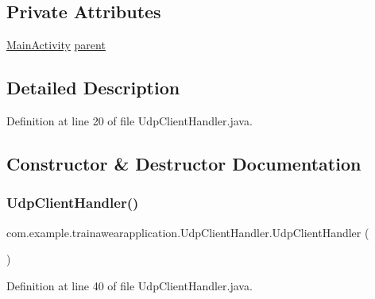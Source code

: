 \subsection*{Private Attributes}
\begin{DoxyCompactItemize}
\item 
\mbox{\hyperlink{classcom_1_1example_1_1trainawearapplication_1_1_main_activity}{Main\+Activity}} \mbox{\hyperlink{classcom_1_1example_1_1trainawearapplication_1_1_udp_client_handler_a93942bc64a7d7d570d27c9e485d361e4}{parent}}
\end{DoxyCompactItemize}


\subsection{Detailed Description}


Definition at line 20 of file Udp\+Client\+Handler.\+java.



\subsection{Constructor \& Destructor Documentation}
\mbox{\label{classcom_1_1example_1_1trainawearapplication_1_1_udp_client_handler_ab5ff425dbf594d074ab709f2be441419}} 
\subsubsection{\texorpdfstring{UdpClientHandler()}{UdpClientHandler()}}
{\footnotesize\ttfamily com.\+example.\+trainawearapplication.\+Udp\+Client\+Handler.\+Udp\+Client\+Handler (\begin{DoxyParamCaption}{ }\end{DoxyParamCaption})}



Definition at line 40 of file Udp\+Client\+Handler.\+java.


\begin{DoxyCode}{0}

\end{DoxyCode}


